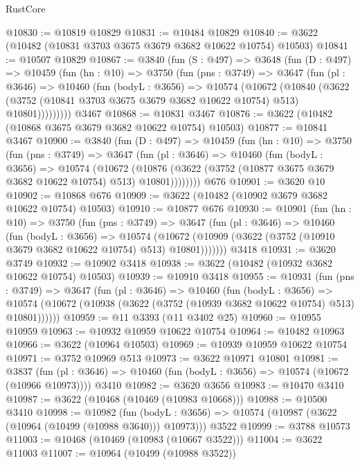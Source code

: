 \begin{lexlean}{RustCore}
\begin{coremodule}
@10830 := @10819 @10829
@10831 := @10484 @10829
@10840 := @3622 (@10482 (@10831 @3703 @3675 @3679 @3682 @10622 @10754) @10503)
@10841 := @10507 @10829
@10867 := @3840
    (fun (S : @497) =>
    @3648
      (fun (D : @497) =>
      @10459
        (fun (hn : @10) =>
        @3750
          (fun (pns : @3749) =>
          @3647
            (fun (pl : @3646) =>
            @10460
              (fun (bodyL : @3656) =>
              @10574
                (@10672
                  (@10840
                    (@3622
                      (@3752 (@10841 @3703 @3675 @3679 @3682 @10622 @10754) @513)
                      @10801)))))))))
    @3467
@10868 := @10831 @3467
@10876 := @3622 (@10482 (@10868 @3675 @3679 @3682 @10622 @10754) @10503)
@10877 := @10841 @3467
@10900 := @3840
    (fun (D : @497) =>
    @10459
      (fun (hn : @10) =>
      @3750
        (fun (pns : @3749) =>
        @3647
          (fun (pl : @3646) =>
          @10460
            (fun (bodyL : @3656) =>
            @10574
              (@10672
                (@10876 (@3622 (@3752 (@10877 @3675 @3679 @3682 @10622 @10754) @513) @10801))))))))
    @676
@10901 := @3620 @10
@10902 := @10868 @676
@10909 := @3622 (@10482 (@10902 @3679 @3682 @10622 @10754) @10503)
@10910 := @10877 @676
@10930 := @10901
    (fun (hn : @10) =>
    @3750
      (fun (pns : @3749) =>
      @3647
        (fun (pl : @3646) =>
        @10460
          (fun (bodyL : @3656) =>
          @10574
            (@10672 (@10909 (@3622 (@3752 (@10910 @3679 @3682 @10622 @10754) @513) @10801)))))))
    @3418
@10931 := @3620 @3749
@10932 := @10902 @3418
@10938 := @3622 (@10482 (@10932 @3682 @10622 @10754) @10503)
@10939 := @10910 @3418
@10955 := @10931
    (fun (pns : @3749) =>
    @3647
      (fun (pl : @3646) =>
      @10460
        (fun (bodyL : @3656) =>
        @10574 (@10672 (@10938 (@3622 (@3752 (@10939 @3682 @10622 @10754) @513) @10801))))))
@10959 := @11 @3393 (@11 @3402 @25)
@10960 := @10955 @10959
@10963 := @10932 @10959 @10622 @10754
@10964 := @10482 @10963
@10966 := @3622 (@10964 @10503)
@10969 := @10939 @10959 @10622 @10754
@10971 := @3752 @10969 @513
@10973 := @3622 @10971 @10801
@10981 := @3837
    (fun (pl : @3646) => @10460 (fun (bodyL : @3656) => @10574 (@10672 (@10966 @10973))))
    @3410
@10982 := @3620 @3656
@10983 := @10470 @3410
@10987 := @3622 (@10468 (@10469 (@10983 @10668)))
@10988 := @10500 @3410
@10998 := @10982
    (fun (bodyL : @3656) => @10574 (@10987 (@3622 (@10964 (@10499 (@10988 @3640))) @10973)))
    @3522
@10999 := @3788 @10573
@11003 := @10468 (@10469 (@10983 (@10667 @3522)))
@11004 := @3622 @11003
@11007 := @10964 (@10499 (@10988 @3522))

\end{coremodule}
\end{lexlean}
